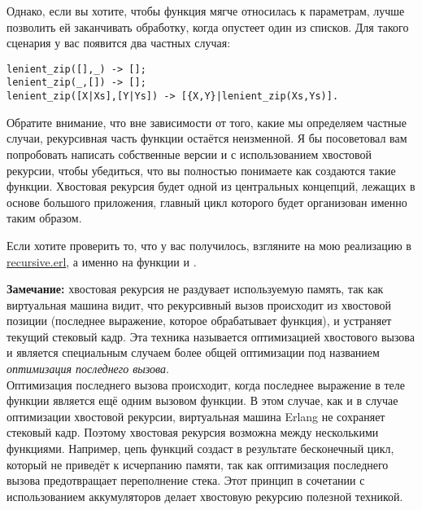 Однако, если вы хотите, чтобы функция мягче относилась к параметрам, лучше позволить ей заканчивать обработку, когда опустеет один из списков.
Для такого сценария у вас появится два частных случая:
\begin{lstlisting}[style=erlang]
lenient_zip([],_) -> [];
lenient_zip(_,[]) -> [];
lenient_zip([X|Xs],[Y|Ys]) -> [{X,Y}|lenient_zip(Xs,Ys)].
\end{lstlisting}

Обратите внимание, что вне зависимости от того, какие мы определяем частные случаи, рекурсивная часть функции остаётся неизменной.
Я бы посоветовал вам попробовать написать собственные версии  и  с использованием хвостовой рекурсии, чтобы убедиться, что вы полностью понимаете как создаются такие функции.
Хвостовая рекурсия будет одной из центральных концепций, лежащих в основе большого приложения, главный цикл которого будет организован именно таким образом.

Если хотите проверить то, что у вас получилось, взгляните на мою реализацию в \href{http://learnyousomeerlang.com/static/erlang/recursive.erl}{recursive.erl}, а именно на функции  и .
\colorbox{lgray}
{
    \begin{minipage}{\linewidth}
\textbf{Замечание:} хвостовая рекурсия не раздувает используемую память, так как виртуальная машина видит, что рекурсивный вызов происходит из хвостовой позиции (последнее выражение, которое обрабатывает функция), и устраняет текущий стековый кадр.
Эта техника называется оптимизацией хвостового вызова и является специальным случаем более общей оптимизации под названием \emph{оптимизация последнего вызова}.\\
Оптимизация последнего вызова происходит, когда последнее выражение в теле функции является ещё одним вызовом функции.
В этом случае, как и в случае оптимизации хвостовой рекурсии, виртуальная машина Erlang не сохраняет стековый кадр.
Поэтому хвостовая рекурсия возможна между несколькими функциями.
Например, цепь функций  создаст в результате бесконечный цикл, который не приведёт к исчерпанию памяти, так как оптимизация последнего вызова предотвращает переполнение стека.
Этот принцип в сочетании с использованием аккумуляторов делает хвостовую рекурсию полезной техникой.
    \end{minipage}
}
